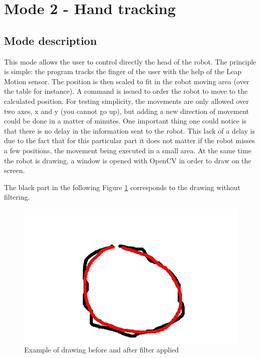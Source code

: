 \section{Mode 2 - Hand tracking}

\subsection{Mode description}

This mode allows the user to control directly the head of the robot. The principle is simple: the program tracks the finger of the user with the help of the Leap Motion sensor. The position is then scaled to fit in the robot moving area (over the table for instance). A command is issued to order the robot to move to the calculated position. For testing simplicity, the movements are only allowed over two axes, x and y (you cannot go up), but adding a new direction of movement could be done in a matter of minutes.
One important thing one could notice is that there is no delay in the information sent to the robot. This lack of a delay is due to the fact that for this particular part it does not matter if the robot misses a few positions, the movement being executed in a small area.
At the same time the robot is drawing, a window is opened with OpenCV in order to draw on the screen.

The black part in the following Figure \ref{fig:cloudNotCloud} corresponds to the drawing without filtering.

\begin{figure}[H]
	\includegraphics[scale = 0.5]{cloudNotCloud}
	\centering
	\caption{Example of drawing before and after filter applied}
	\label{fig:cloudNotCloud}
\end{figure}

